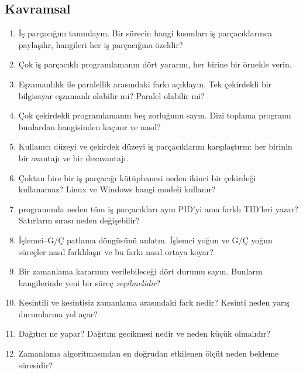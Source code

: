 \subsection*{Kavramsal}
\begin{enumerate}[leftmargin=1.6em]
  \item İş parçacığını tanımlayın. Bir sürecin hangi kısımları iş parçacıklarınca paylaşılır, hangileri her iş parçacığına özeldir?
  \item Çok iş parçacıklı programlamanın dört yararını, her birine bir örnekle verin.
  \item Eşzamanlılık ile paralellik arasındaki farkı açıklayın. Tek çekirdekli bir bilgisayar eşzamanlı olabilir mi? Paralel olabilir mi?
  \item Çok çekirdekli programlamanın beş zorluğunu sayın. Dizi toplama programı bunlardan hangisinden kaçınır ve nasıl?
  \item Kullanıcı düzeyi ve çekirdek düzeyi iş parçacıklarını karşılaştırın: her birinin bir avantajı ve bir dezavantajı.
  \item Çoktan bire bir iş parçacığı kütüphanesi neden ikinci bir çekirdeği kullanamaz? Linux ve Windows hangi modeli kullanır?
  \item {} programında neden tüm iş parçacıkları aynı PID'yi ama farklı TID'leri yazar? Satırların sırası neden değişebilir?
  \item İşlemci--G/Ç patlama döngüsünü anlatın. İşlemci yoğun ve G/Ç yoğun süreçler nasıl farklılaşır ve  bu farkı nasıl ortaya koyar?
  \item Bir zamanlama kararının verilebileceği dört durumu sayın. Bunların hangilerinde yeni bir süreç \emph{seçilmelidir}?
  \item Kesintili ve kesintisiz zamanlama arasındaki fark nedir? Kesinti neden yarış durumlarına yol açar?
  \item Dağıtıcı ne yapar? Dağıtım gecikmesi nedir ve neden küçük olmalıdır?
  \item Zamanlama algoritmasından en doğrudan etkilenen ölçüt neden bekleme süresidir?
\end{enumerate}

